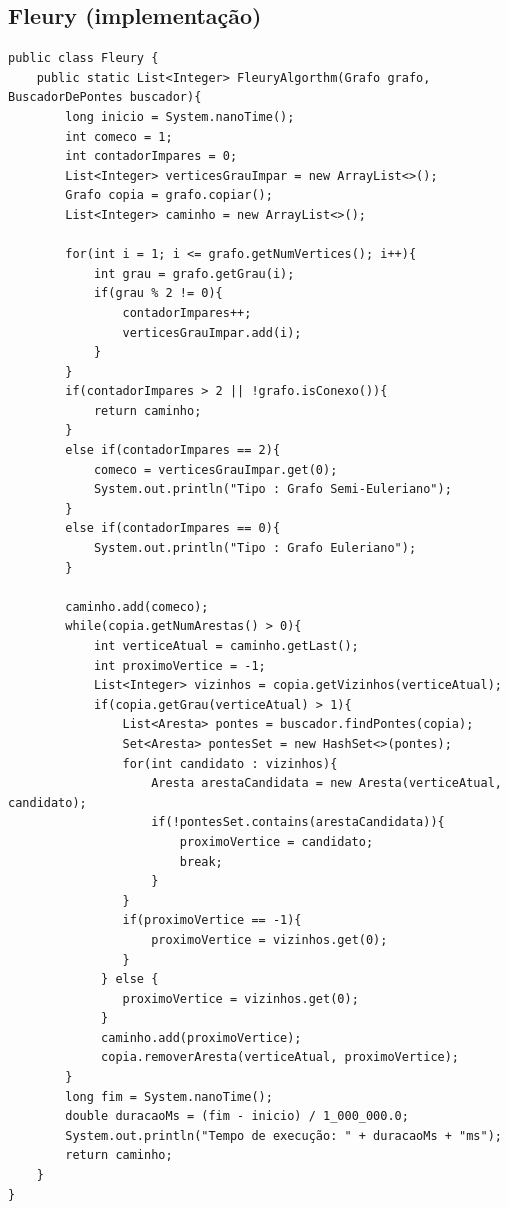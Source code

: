 \documentclass[12pt]{article}
\begin{document}
\subsection{Fleury (implementação)}
\begin{lstlisting}
public class Fleury {
    public static List<Integer> FleuryAlgorthm(Grafo grafo, BuscadorDePontes buscador){
        long inicio = System.nanoTime();
        int comeco = 1; 
        int contadorImpares = 0;
        List<Integer> verticesGrauImpar = new ArrayList<>();
        Grafo copia = grafo.copiar();
        List<Integer> caminho = new ArrayList<>();

        for(int i = 1; i <= grafo.getNumVertices(); i++){
            int grau = grafo.getGrau(i);
            if(grau % 2 != 0){
                contadorImpares++;
                verticesGrauImpar.add(i);
            }
        }
        if(contadorImpares > 2 || !grafo.isConexo()){
            return caminho; 
        }
        else if(contadorImpares == 2){
            comeco = verticesGrauImpar.get(0);
            System.out.println("Tipo : Grafo Semi-Euleriano");
        }
        else if(contadorImpares == 0){
            System.out.println("Tipo : Grafo Euleriano");
        }

        caminho.add(comeco);
        while(copia.getNumArestas() > 0){
            int verticeAtual = caminho.getLast();
            int proximoVertice = -1; 
            List<Integer> vizinhos = copia.getVizinhos(verticeAtual);
            if(copia.getGrau(verticeAtual) > 1){
                List<Aresta> pontes = buscador.findPontes(copia);
                Set<Aresta> pontesSet = new HashSet<>(pontes);
                for(int candidato : vizinhos){
                    Aresta arestaCandidata = new Aresta(verticeAtual, candidato);
                    if(!pontesSet.contains(arestaCandidata)){
                        proximoVertice = candidato;
                        break;
                    } 
                }
                if(proximoVertice == -1){
                    proximoVertice = vizinhos.get(0);
                }
             } else {
                proximoVertice = vizinhos.get(0);
             }
             caminho.add(proximoVertice);
             copia.removerAresta(verticeAtual, proximoVertice);     
        }
        long fim = System.nanoTime();
        double duracaoMs = (fim - inicio) / 1_000_000.0;
        System.out.println("Tempo de execução: " + duracaoMs + "ms");
        return caminho;
    }
}
\end{lstlisting}
\end{document}
